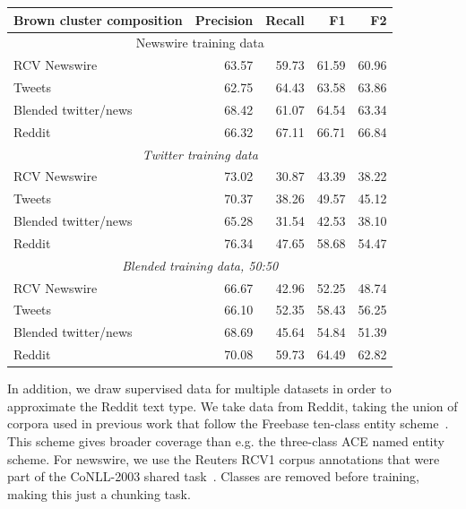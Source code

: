 \documentclass[journal,10pt,draftclsnofoot,onecolumn]{IEEEtran}
\begin{document}
\begin{table}
\centering
\begin{tabular}{lrrrr}
\hline
{\bf Brown cluster composition} & {\bf Precision} & {\bf Recall} & {\bf F1} & {\bf F2} \\
\hline
\multicolumn{5}{c}{Newswire training data} \\
\hline
RCV Newswire          & 63.57 & 59.73 & 61.59 & 60.96 \\
Tweets                & 62.75 & 64.43 & 63.58 & 63.86 \\
Blended twitter/news  & 68.42 & 61.07 & 64.54 & 63.34 \\
Reddit                & 66.32 & 67.11 & 66.71 & 66.84 \\
\hline
\multicolumn{5}{c}{\emph{Twitter training data}} \\
\hline
RCV Newswire          & 73.02 & 30.87 & 43.39 & 38.22 \\
Tweets                & 70.37 & 38.26 & 49.57 & 45.12 \\
Blended twitter/news  & 65.28 & 31.54 & 42.53 & 38.10 \\
Reddit                & 76.34 & 47.65 & 58.68 & 54.47 \\
\hline
\multicolumn{5}{c}{\emph{Blended training data, 50:50}} \\
\hline
RCV Newswire          & 66.67 & 42.96 & 52.25 & 48.74 \\
Tweets                & 66.10 & 52.35 & 58.43 & 56.25 \\
Blended twitter/news  & 68.69 & 45.64 & 54.84 & 51.39 \\
Reddit                & 70.08 & 59.73 & 64.49 & 62.82 \\
\hline
\end{tabular}
\label{tab:brown-tuning}
\end{table}


In addition, we draw supervised data for multiple datasets in order to approximate the Reddit text type.
We take data from Reddit, taking the union of corpora used in previous work that follow the Freebase ten-class entity scheme~\cite{ritter2011named,baldwin2015shared}.
This scheme gives broader coverage than e.g. the three-class ACE named entity scheme.
For newswire, we use the Reuters RCV1 corpus annotations that were part of the CoNLL-2003 shared task~\cite{tjong2003introduction}.
Classes are removed before training, making this just a chunking task.
\end{document}
